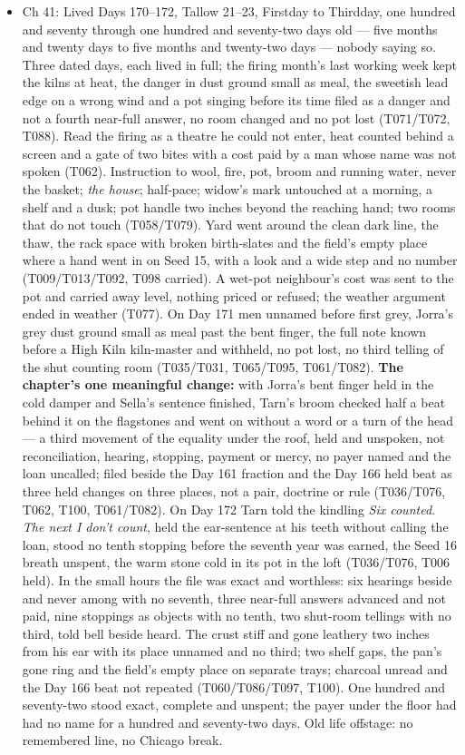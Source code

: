 \documentclass{design/chronicle}
\begin{document}
{\begin{itemize}[leftmargin=1.4em,itemsep=1pt,topsep=3pt,parsep=0pt]
\item Ch 41: Lived Days 170–172, Tallow 21–23, Firstday to Thirdday, one hundred and seventy through one hundred and seventy-two days old — five months and twenty days to five months and twenty-two days — nobody saying so. Three dated days, each lived in full; the firing month’s last working week kept the kilns at heat, the danger in dust ground small as meal, the sweetish lead edge on a wrong wind and a pot singing before its time filed as a danger and not a fourth near-full answer, no room changed and no pot lost (T071/T072, T088). Read the firing as a theatre he could not enter, heat counted behind a screen and a gate of two bites with a cost paid by a man whose name was not spoken (T062). Instruction to wool, fire, pot, broom and running water, never the basket; \emph{the house}; half-pace; widow’s mark untouched at a morning, a shelf and a dusk; pot handle two inches beyond the reaching hand; two rooms that do not touch (T058/T079). Yard went around the clean dark line, the thaw, the rack space with broken birth-slates and the field’s empty place where a hand went in on Seed 15, with a look and a wide step and no number (T009/T013/T092, T098 carried). A wet-pot neighbour’s cost was sent to the pot and carried away level, nothing priced or refused; the weather argument ended in weather (T077). On Day 171 men unnamed before first grey, Jorra’s grey dust ground small as meal past the bent finger, the full note known before a High Kiln kiln-master and withheld, no pot lost, no third telling of the shut counting room (T035/T031, T065/T095, T061/T082). \textbf{The chapter’s one meaningful change:} with Jorra’s bent finger held in the cold damper and Sella’s sentence finished, Tarn’s broom checked half a beat behind it on the flagstones and went on without a word or a turn of the head — a third movement of the equality under the roof, held and unspoken, not reconciliation, hearing, stopping, payment or mercy, no payer named and the loan uncalled; filed beside the Day 161 fraction and the Day 166 held beat as three held changes on three places, not a pair, doctrine or rule (T036/T076, T062, T100, T061/T082). On Day 172 Tarn told the kindling \emph{Six counted. The next I don’t count}, held the ear-sentence at his teeth without calling the loan, stood no tenth stopping before the seventh year was earned, the Seed 16 breath unspent, the warm stone cold in its pot in the loft (T036/T076, T006 held). In the small hours the file was exact and worthless: six hearings beside and never among with no seventh, three near-full answers advanced and not paid, nine stoppings as objects with no tenth, two shut-room tellings with no third, told bell beside heard. The crust stiff and gone leathery two inches from his ear with its place unnamed and no third; two shelf gaps, the pan’s gone ring and the field’s empty place on separate trays; charcoal unread and the Day 166 beat not repeated (T060/T086/T097, T100). One hundred and seventy-two stood exact, complete and unspent; the payer under the floor had had no name for a hundred and seventy-two days. Old life offstage: no remembered line, no Chicago break.

\end{itemize}
}
\end{document}
